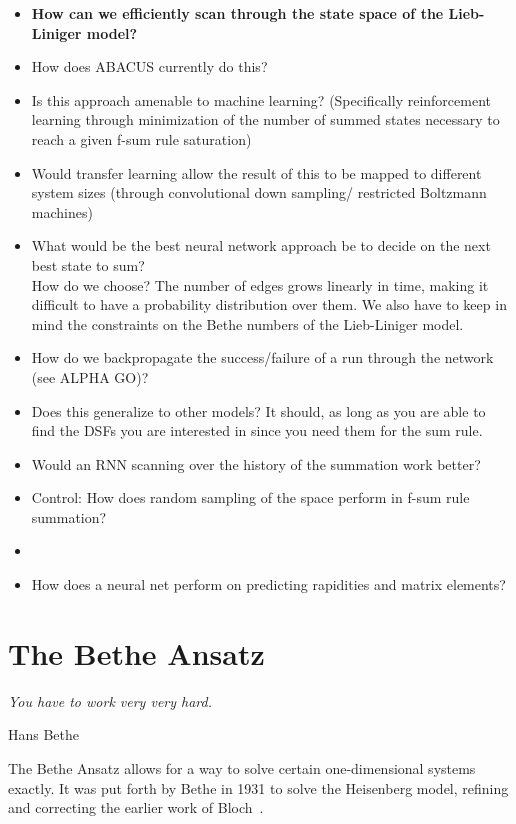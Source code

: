 \documentclass[11pt, a4paper]{report} %
\begin{document}
\begin{itemize}
  \item \textbf{How can we efficiently scan through the state space of the Lieb-Liniger model?}
  \item How does ABACUS currently do this?
  \item Is this approach amenable to machine learning? (Specifically reinforcement learning through minimization of the number of summed states necessary to reach a given f-sum rule saturation)
  \item Would transfer learning allow the result of this to be mapped to different system sizes (through convolutional down sampling/ restricted Boltzmann machines)
  \item What would be the best neural network approach be to decide on the next best state to sum? \\ How do we choose? The number of edges grows linearly in time, making it difficult to have a probability distribution over them. We also have to keep in mind the constraints on the Bethe numbers of the Lieb-Liniger model.    
  \item How do we backpropagate the success/failure of a run through the network (see ALPHA GO)?
  \item Does this generalize to other models? It should, as long as you are able to find the DSFs you are interested in since you need them for the sum rule.
  \item Would an RNN scanning over the history of the summation work better?
  \item Control: How does random sampling of the space perform in f-sum rule summation?
  \item
  \item How does a neural net perform on predicting rapidities and matrix elements?
\end{itemize}

\chapter{The Bethe Ansatz}\label{chap:bethe_ansatz}

\epigraph{\textit{You have to work very very hard.}}{Hans Bethe}

The Bethe Ansatz allows for a way to solve certain one-dimensional systems exactly.
It was put forth by Bethe in 1931 to solve the Heisenberg model, refining and correcting the earlier work of Bloch~\cite{Bethe1931}.
\end{document}
